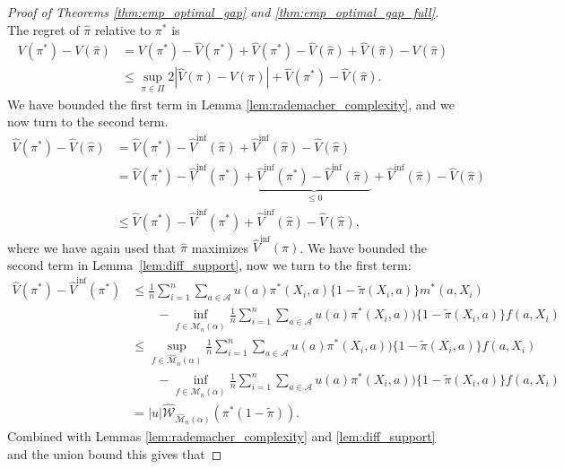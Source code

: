 \documentclass[12pt]{article}
\theoremstyle{definition}
\newcommand{\<}{\langle}
\renewcommand{\>}{\rangle}
\newcommand\mcal[1]{\ensuremath{\mathcal{#1}}}
\begin{document}
\begin{proof}[Proof of Theorems \ref{thm:emp_optimal_gap} and \ref{thm:emp_optimal_gap_full}]
  The regret of $\hat{\pi}$ relative to $\pi^\ast$ is
  \[
    \begin{aligned}
      V(\pi^\ast) - V(\hat{\pi})
      & = V(\pi^\ast) - \hat{V}(\pi^\ast) + \hat{V}(\pi^\ast) - \hat{V}(\hat{\pi}) + \hat{V}(\hat{\pi}) - V(\hat{\pi})\\
      & \leq \sup_{\pi \in \Pi} 2|\hat{V}(\pi) - V(\pi)| + \hat{V}(\pi^\ast) - \hat{V}(\hat{\pi}).
    \end{aligned}
  \]
  We have bounded the first term in Lemma \ref{lem:rademacher_complexity}, and we now turn to the second term.
  \[
    \begin{aligned}
      \hat{V}(\pi^\ast) - \hat{V}(\hat{\pi}) & = \hat{V}(\pi^\ast) - \hat{V}^{\inf} (\hat{\pi}) + \hat{V}^{\inf} (\hat{\pi}) - \hat{V} (\hat{\pi})\\
      & = \hat{V}(\pi^\ast) - \hat{V}^{\inf} (\pi^\ast)  + \underbrace{\hat{V}^{\inf} (\pi^\ast)  - \hat{V}^{\inf} (\hat{\pi})}_{\leq 0} + \hat{V}^{\inf} (\hat{\pi}) - \hat{V} (\hat{\pi})\\
      & \leq \hat{V}(\pi^\ast) - \hat{V}^{\inf} (\pi^\ast) + \hat{V}^{\inf} (\hat{\pi}) - \hat{V} (\hat{\pi}),
    \end{aligned}
  \]
  where we have again used that $\hat{\pi}$ maximizes $\hat{V}^{\inf}(\pi)$. We have bounded the second term in Lemma~\ref{lem:diff_support}, now we turn to the first term:
\[
  \begin{aligned}
    \hat{V}(\pi^\ast) - \hat{V}^{\inf}(\pi^\ast)& \leq \frac{1}{n}\sum_{i=1}^n\sum_{a \in \mathcal{A}}u(a)\pi^\ast(X_i, a) \{1 - \tilde{\pi}(X_i, a)\}m^\ast(a, X_i) \\
    & \qquad -  \inf_{f \in \widehat{\mcal{M}}_n(\alpha)} \frac{1}{n}\sum_{i=1}^n\sum_{a \in \mcal{A}} u(a)\pi^\ast(X_i, a))\{1 - \tilde{\pi}(X_i, a)\} f(a, X_i)\\
    & \leq \sup_{f \in \widehat{\mcal{M}}_n(\alpha)} \frac{1}{n}\sum_{i=1}^n\sum_{a \in \mcal{A}} u(a) \pi^\ast(X_i, a))\{1 - \tilde{\pi}(X_i, a)\} f(a, X_i)\\
    & \qquad -  \inf_{f \in \widehat{\mcal{M}}_n(\alpha)} \frac{1}{n}\sum_{i=1}^n\sum_{a \in \mcal{A}} u(a) \pi^\ast(X_i, a))\{1 - \tilde{\pi}(X_i, a)\} f(a, X_i)\\
    & = |u|\widehat{\mcal{W}}_{\widehat{\mcal{M}}_n(\alpha)}\left(\pi^\ast (1 - \tilde{\pi})\right).
  \end{aligned}
\]
Combined with Lemmas \ref{lem:rademacher_complexity} and \ref{lem:diff_support} and the union bound this gives that

\end{proof}
\end{document}
